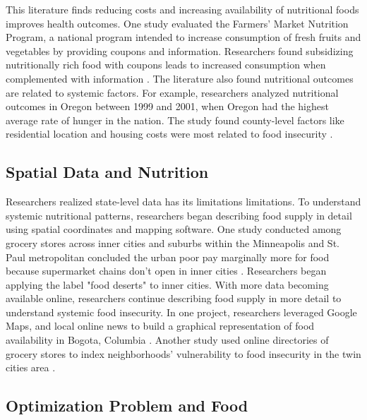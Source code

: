 \documentclass{report}
\begin{document}
This literature finds reducing costs and increasing availability of nutritional foods improves health outcomes. One study evaluated the Farmers' Market Nutrition Program, a national program intended to increase consumption of fresh fruits and vegetables by providing coupons and information. Researchers found subsidizing nutritionally rich food with coupons leads to increased consumption when complemented with information \cite{Just}. The literature also found nutritional outcomes are related to systemic factors. For example, researchers analyzed nutritional outcomes in Oregon between 1999 and 2001, when Oregon had the highest average rate of hunger in the nation. The study found county-level factors like residential location and housing costs were most related to food insecurity \cite{Bernell}. 


\subsection{Spatial Data and Nutrition}

Researchers realized state-level data has its limitations limitations. To understand systemic nutritional patterns, researchers began describing food supply in detail using spatial coordinates and mapping software.  One study conducted among grocery stores across inner cities and suburbs within the Minneapolis and St. Paul metropolitan concluded the urban poor pay marginally more for food because supermarket chains don't open in inner cities \cite{Chung}. Researchers began applying the label "food deserts" to inner cities. With more data becoming available online, researchers continue describing food supply in more detail to understand systemic food insecurity. In one project, researchers leveraged Google Maps, and local online news to build a graphical representation of food availability in Bogota, Columbia \cite{Hwang}. Another study used online directories of grocery stores to index neighborhoods' vulnerability to food insecurity in the twin cities area \cite{Larson}.
 
\subsection{Optimization Problem and Food}
\end{document}
